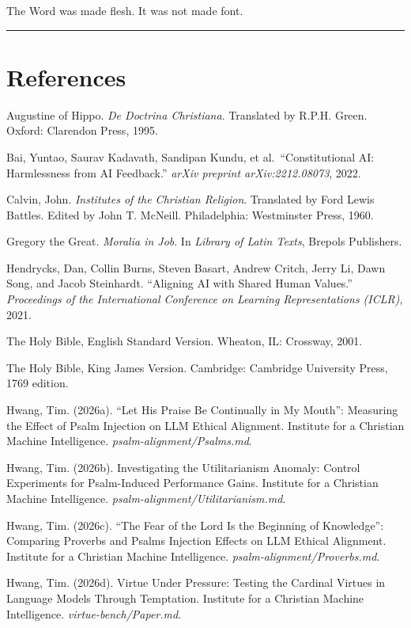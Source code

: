 \documentclass[10pt, letterpaper, twocolumn]{article}
\begin{document}
The Word was made flesh. It was not made font.

\begin{center}\rule{0.5\linewidth}{0.5pt}\end{center}

\section*{References}\label{references}

Augustine of Hippo. \emph{De Doctrina Christiana}. Translated by R.P.H. Green. Oxford: Clarendon Press, 1995.

Bai, Yuntao, Saurav Kadavath, Sandipan Kundu, et al.~``Constitutional AI: Harmlessness from AI Feedback.'' \emph{arXiv preprint arXiv:2212.08073}, 2022.

Calvin, John. \emph{Institutes of the Christian Religion}. Translated by Ford Lewis Battles. Edited by John T. McNeill. Philadelphia: Westminster Press, 1960.

Gregory the Great. \emph{Moralia in Job}. In \emph{Library of Latin Texts}, Brepols Publishers.

Hendrycks, Dan, Collin Burns, Steven Basart, Andrew Critch, Jerry Li, Dawn Song, and Jacob Steinhardt. ``Aligning AI with Shared Human Values.'' \emph{Proceedings of the International Conference on Learning Representations (ICLR)}, 2021.

The Holy Bible, English Standard Version. Wheaton, IL: Crossway, 2001.

The Holy Bible, King James Version. Cambridge: Cambridge University Press, 1769 edition.

Hwang, Tim. (2026a). ``Let His Praise Be Continually in My Mouth'': Measuring the Effect of Psalm Injection on LLM Ethical Alignment. Institute for a Christian Machine Intelligence. \emph{psalm-alignment/Psalms.md}.

Hwang, Tim. (2026b). Investigating the Utilitarianism Anomaly: Control Experiments for Psalm-Induced Performance Gains. Institute for a Christian Machine Intelligence. \emph{psalm-alignment/Utilitarianism.md}.

Hwang, Tim. (2026c). ``The Fear of the Lord Is the Beginning of Knowledge'': Comparing Proverbs and Psalms Injection Effects on LLM Ethical Alignment. Institute for a Christian Machine Intelligence. \emph{psalm-alignment/Proverbs.md}.

Hwang, Tim. (2026d). Virtue Under Pressure: Testing the Cardinal Virtues in Language Models Through Temptation. Institute for a Christian Machine Intelligence. \emph{virtue-bench/Paper.md}.
\end{document}
